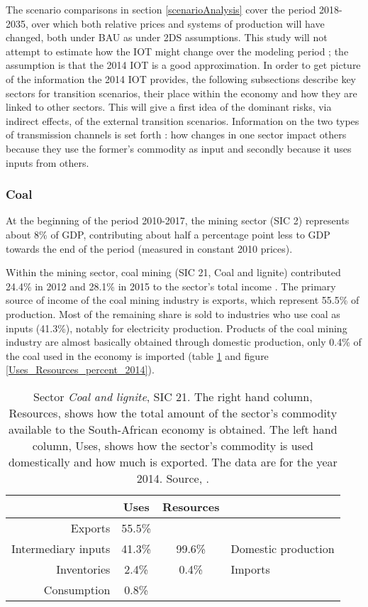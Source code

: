 \documentclass[12pt,english]{article}
\begin{document}
The scenario comparisons in section \ref{scenarioAnalysis} cover the period 2018-2035, over which both relative prices and systems of production will have changed, both under BAU as under 2DS assumptions. This study will not attempt to estimate how the IOT might change over the modeling period ; the assumption is that the 2014 IOT is a good approximation. In order to get picture of the information the 2014 IOT provides, the following subsections describe key sectors for transition scenarios, their place within the economy and how they are linked to other sectors. This will give a first idea of the dominant risks, via indirect effects, of the external transition scenarios. Information on the two types of transmission channels is set forth : how changes in one sector impact others because they use the former's commodity as input and secondly because it uses inputs from others. 


\subsubsection{Coal}
At the beginning of the period 2010-2017, the mining sector (SIC 2) represents about 8\% of GDP, contributing about half a percentage point less to GDP towards the end of the period \citep{P0441StatSA2018Q2} (measured in constant 2010 prices). 

Within the mining sector, coal mining (SIC 21, Coal and lignite) contributed 24.4\% in 2012 and 28.1\% in 2015 to the sector's total income \citep{mining2015}. The primary source of income of the coal mining industry is exports, which represent 55.5\% of production. Most of the remaining share is sold to industries who use coal as inputs (41.3\%), notably for electricity production. Products of the coal mining industry are almost basically obtained through domestic production, only 0.4\% of the coal used in the economy is imported (table \ref{Mining2104_UR} and figure \ref{Uses_Resources_percent_2014}).

\begin{table}[!h]
	\centering
	\begin{tabular}{rc|cl}
		\hline
		& Uses & Resources  \\ 
		\hline
		Exports & 55.5\% & &\\ 
		Intermediary inputs &  41.3\%  & 99.6\% &  Domestic production\\ 
		Inventories &  2.4\% & 0.4\% & Imports    \\ 
		Consumption & 0.8\% &  &\\ 
		\hline
	\end{tabular}
	\caption{\label{Mining2104_UR}Sector \emph{Coal and lignite}, SIC 21. The right hand column, Resources, shows how the total amount of the sector's commodity available to the South-African economy is obtained. The left hand column, Uses, shows how the sector's commodity is used domestically and how much is exported. The data are for the year 2014. Source, \cite{IOT2014}.}
\end{table} 
\end{document}
